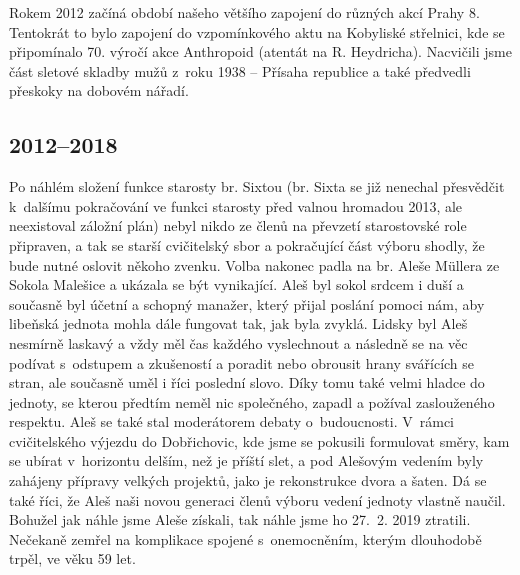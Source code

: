 \documentclass[a5paper, 11pt, twoside]{article}
\begin{document}
Rokem 2012 začíná období našeho většího zapojení do různých akcí Prahy
8. Tentokrát to bylo zapojení do vzpomínkového aktu na Kobyliské
střelnici, kde se připomínalo 70. výročí akce Anthropoid (atentát na R.
Heydricha). Nacvičili jsme část sletové skladby mužů z~roku 1938 --
Přísaha republice a také předvedli přeskoky na dobovém nářadí.

\clearpage

\subsection{2012--2018}

Po náhlém složení funkce starosty br. Sixtou (br. Sixta se již nenechal
přesvědčit k~dalšímu pokračování ve funkci starosty před valnou hromadou
2013, ale neexistoval záložní plán) nebyl nikdo ze členů na převzetí
starostovské role připraven, a tak se starší cvičitelský sbor a
pokračující část výboru shodly, že bude nutné oslovit někoho zvenku.
Volba nakonec padla na br. Aleše Müllera ze Sokola Malešice a ukázala se
být vynikající. Aleš byl sokol srdcem i duší a současně byl účetní a
schopný manažer, který přijal poslání pomoci nám, aby libeňská jednota
mohla dále fungovat tak, jak byla zvyklá. Lidsky byl Aleš nesmírně
laskavý a vždy měl čas každého vyslechnout a následně se na věc podívat
s~odstupem a zkušeností a poradit nebo obrousit hrany svářících se
stran, ale současně uměl i říci poslední slovo. Díky tomu také velmi
hladce do jednoty, se kterou předtím neměl nic společného, zapadl a
požíval zaslouženého respektu. Aleš se také stal moderátorem debaty
o~budoucnosti. V~rámci cvičitelského výjezdu do Dobřichovic, kde jsme se
pokusili formulovat směry, kam se ubírat v~horizontu delším, než je
příští slet, a pod Alešovým vedením byly zahájeny přípravy velkých
projektů, jako je rekonstrukce dvora a šaten. Dá se také říci, že Aleš
naši novou generaci členů výboru vedení jednoty vlastně naučil. Bohužel
jak náhle jsme Aleše získali, tak náhle jsme ho 27.~2. 2019 ztratili.
Nečekaně zemřel na komplikace spojené s~onemocněním, kterým dlouhodobě
trpěl, ve věku 59 let.
\end{document}
